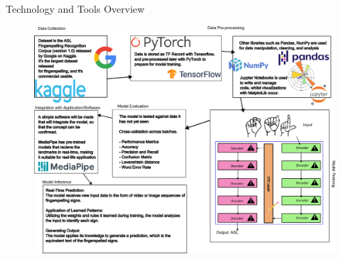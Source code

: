 \documentclass{beamer} %
\begin{document}
\begin{frame}[t]
\begin{columns}[t]
\begin{column}{0.3\textwidth}

			\begin{block}{Technology and Tools Overview}
				\begin{figure}
					\includegraphics[width=\linewidth]{drawing.png}
				\end{figure}
			\end{block}



\end{column}
\end{columns}
\end{frame}
\end{document}
